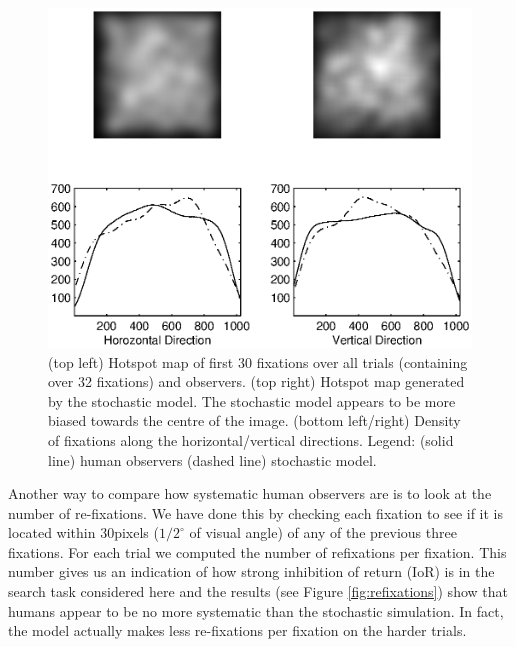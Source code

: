 \begin{figure}
	\centering
		\includegraphics[width=14.9cm]{figures/hotspotcomparison.eps}
	\caption{(top left) Hotspot map of first 30 fixations over all trials (containing over 32 fixations) and observers. (top right) Hotspot map generated by the stochastic model. The stochastic model appears to be more biased towards the centre of the image. (bottom left/right) Density of fixations along the horizontal/vertical directions. Legend: (solid line) human observers (dashed line) stochastic model.}
	\label{fig:hotspot}
\end{figure}

\par

Another way to compare how systematic human observers are is to look at the number of re-fixations. We have done this by checking each fixation to see if it is located within $30$pixels ($1/2^{\circ}$ of visual angle) of any of the previous three fixations. For each trial we computed the number of refixations per fixation. This number gives us an indication of how strong inhibition of return (IoR) is in the search task considered here and the results (see Figure \ref{fig:refixations}) show that humans appear to be no more systematic than the stochastic simulation. In fact, the model actually makes less re-fixations per fixation on the harder trials.

